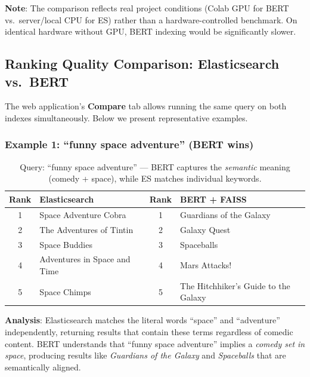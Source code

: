 \documentclass[11pt,a4paper]{article}
\begin{document}
\noindent \textbf{Note}: The comparison reflects real project conditions (Colab GPU for BERT vs.\ server/local CPU for ES) rather than a hardware-controlled benchmark. On identical hardware without GPU, BERT indexing would be significantly slower.

\subsection{Ranking Quality Comparison: Elasticsearch vs.\ BERT}
\label{sec:comparison}

The web application's \textbf{Compare} tab allows running the same query on both indexes simultaneously. Below we present representative examples.

\subsubsection{Example 1: ``funny space adventure'' (BERT wins)}

\begin{table}[H]
\centering
\small
\begin{tabular}{@{}clcl@{}}
\toprule
\textbf{Rank} & \textbf{Elasticsearch} & \textbf{Rank} & \textbf{BERT + FAISS} \\
\midrule
1 & Space Adventure Cobra & 1 & Guardians of the Galaxy \\
2 & The Adventures of Tintin & 2 & Galaxy Quest \\
3 & Space Buddies & 3 & Spaceballs \\
4 & Adventures in Space and Time & 4 & Mars Attacks! \\
5 & Space Chimps & 5 & The Hitchhiker's Guide to the Galaxy \\
\bottomrule
\end{tabular}
\caption{Query: ``funny space adventure'' --- BERT captures the \textit{semantic} meaning (comedy + space), while ES matches individual keywords.}
\label{tab:compare1}
\end{table}

\noindent \textbf{Analysis}: Elasticsearch matches the literal words ``space'' and ``adventure'' independently, returning results that contain these terms regardless of comedic content. BERT understands that ``funny space adventure'' implies a \textit{comedy set in space}, producing results like \textit{Guardians of the Galaxy} and \textit{Spaceballs} that are semantically aligned.
\end{document}
